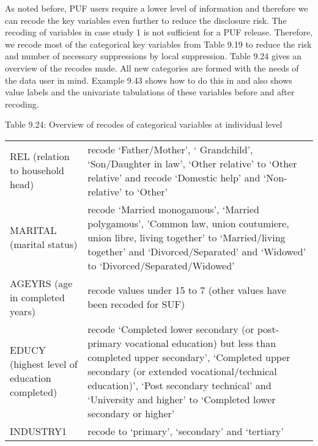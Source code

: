 \documentclass[letterpaper,10pt,english]{sphinxmanual}
\begin{document}

As noted before, PUF users require a lower level of information and
therefore we can recode the key variables even further to reduce the
disclosure risk. The recoding of variables in case study 1 is not
sufficient for a PUF release. Therefore, we recode most of the
categorical key variables from Table 9.19 to reduce the risk and number
of necessary suppressions by local suppression. Table 9.24 gives an
overview of the recodes made. All new categories are formed with the
needs of the data user in mind. Example 9.43 shows how to do this in 
and also shows value labels and the univariate tabulations of these
variables before and after recoding.

Table 9.24: Overview of recodes of categorical variables at individual
level


\begin{savenotes}\sphinxattablestart
\centering
\begin{tabulary}{\linewidth}[t]{|T|T|}
\hline
\sphinxstyletheadfamily 
{}
&\sphinxstyletheadfamily 
{}
\\
\hline
REL (relation to household head)
&
recode ‘Father/Mother’, ‘
Grandchild’, ‘Son/Daughter in
law’, ‘Other relative’ to ‘Other
relative’ and recode ‘Domestic
help’ and ‘Non-relative’ to
‘Other’
\\
\hline
MARITAL (marital status)
&
recode ‘Married monogamous’,
‘Married polygamous’, ’Common
law, union coutumiere, union
libre, living together’ to
‘Married/living together’ and
‘Divorced/Separated’ and
‘Widowed’ to
‘Divorced/Separated/Widowed’
\\
\hline
AGEYRS (age in completed years)
&
recode values under 15 to 7
(other values have been recoded
for SUF)
\\
\hline
EDUCY (highest level of education
completed)
&
recode ‘Completed lower secondary
(or post-primary vocational
education) but less than
completed upper secondary’,
‘Completed upper secondary (or
extended vocational/technical
education)’, ‘Post secondary
technical’ and ‘University and
higher’ to ‘Completed lower
secondary or higher’
\\
\hline
INDUSTRY1
&
recode to ‘primary’, ‘secondary’
and ‘tertiary’
\\
\hline
\end{tabulary}
\par
\sphinxattableend\end{savenotes}
\end{document}
